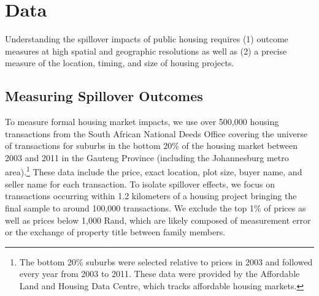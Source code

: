 \documentclass[12pt]{article}
\begin{document}


\section{Data}

Understanding the spillover impacts of public housing requires (1) outcome measures at high spatial and geographic resolutions as well as (2) a precise measure of the location, timing, and size of housing projects.  

\subsection{Measuring Spillover Outcomes}

To measure formal housing market impacts, we use over 500,000 housing transactions from the South African National Deeds Office covering the universe of transactions for suburbs in the bottom 20\% of the housing market between 2003 and 2011 in the Gauteng Province (including the Johannesburg metro area).\footnote{The bottom 20\% suburbs were selected relative to prices in 2003 and followed every year from 2003 to 2011.  These data were provided by the Affordable Land and Housing Data Centre, which tracks affordable housing markets.}  These data include the price, exact location, plot size, buyer name, and seller name for each transaction.  To isolate spillover effects, we focus on transactions occurring within 1.2 kilometers of a housing project bringing the final sample to around 100,000 transactions.  We exclude the top 1\% of prices as well as prices below 1,000 Rand, which are likely composed of measurement error or the exchange of property title between family members.
\end{document}
